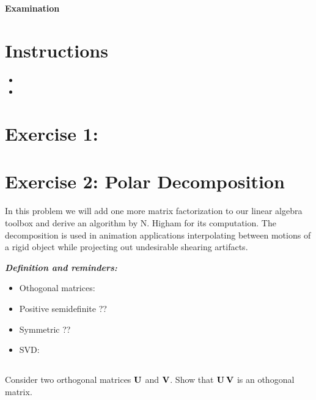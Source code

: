 

\lstset{
  language=Algo,
  basicstyle=\sffamily,
  columns=fullflexible,
  mathescape
}

\begin{center}
{\large\textbf{Examination}}\\
\end{center}

\noindent\makebox[\linewidth]{\rule{\linewidth}{0.6pt}}
 
\section{Instructions}

\begin{itemize}
\item
\item
\end{itemize}



\noindent\makebox[\linewidth]{\rule{\linewidth}{0.6pt}}

\section{Exercise 1: }

\section{Exercise 2: Polar Decomposition}

In this problem we will add one more matrix factorization to our linear algebra toolbox and derive an algorithm by N. Higham for its computation.  The decomposition  is  used  in  animation  applications  interpolating  between  motions  of  a  rigid  object while projecting out undesirable shearing artifacts.

{\it\textbf{Definition and reminders:}
\begin{itemize}
\item Othogonal matrices:
\item Positive semidefinite  ??
\item Symmetric ??
\item SVD:
\end{itemize}
}
\subsection{} Consider two orthogonal matrices ${\bf U}$ and ${\bf V}$. Show that ${\bf U\:V}$ is an othogonal matrix.

